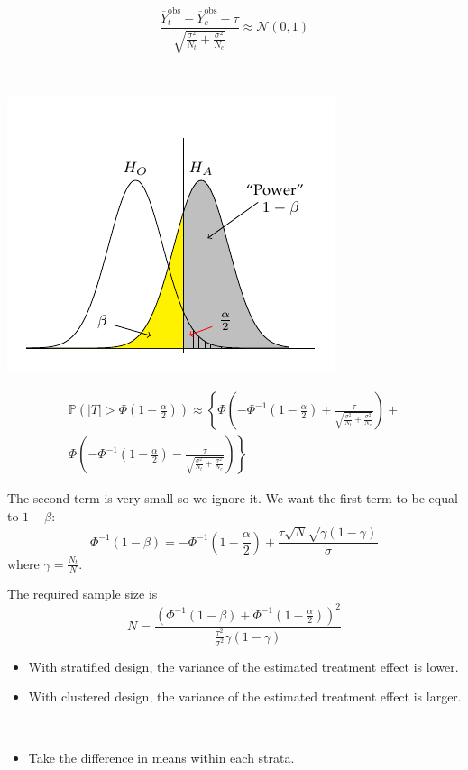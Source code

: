 \documentclass[a4paper,10pt,landscape]{article}
\begin{document}
\begin{multicols*}{3}
\begin{description}
	$$\dfrac{\overline{Y}_t^\text{obs}-\overline{Y}_c^\text{obs}-\tau}{\sqrt{\frac{\sigma^2}{N_t}+\frac{\sigma^2}{N_c}}}\approx\mathcal{N}(0,1)$$
	\item[Statistical Power] ~
	\begin{center}
		\includegraphics*[width=0.6\columnwidth,trim={0 0.1cm 0 1.1cm},clip]{power2.pdf}
	\end{center}
	\begin{multline*}
		\mathbb{P}\left(|T|>\Phi\left(1-\frac{\alpha}{2}\right)\right)\approx\left\{\Phi\left(-\Phi^{-1}\left(1-\frac{\alpha}{2}\right)+\frac{\tau}{\sqrt{\frac{\sigma^2}{N_t}+\frac{\sigma^2}{N_c}}}\right)+\right.\\
		\left.\Phi\left(-\Phi^{-1}\left(1-\frac{\alpha}{2}\right)-\frac{\tau}{\sqrt{\frac{\sigma^2}{N_t}+\frac{\sigma^2}{N_c}}}\right)\right\}
	\end{multline*}
	\item The second term is very small so we ignore it. We want the first term to be equal to $1-\beta$:
	$$\Phi^{-1}\left(1-\beta\right)=-\Phi^{-1}\left(1-\frac{\alpha}{2}\right)+\frac{\tau\sqrt{N}\sqrt{\gamma(1-\gamma)}}{\sigma}$$
	where $\gamma=\frac{N_t}{N}$.
	\item The required sample size is
	$$N=\dfrac{\left(\Phi^{-1}\left(1-\beta\right)+\Phi^{-1}\left(1-\frac{\alpha}{2}\right)\right)^2}{\frac{\tau^2}{\sigma^2}\gamma\left(1-\gamma\right)}$$
	\begin{itemize}
		\item With stratified design, the variance of the estimated treatment effect is lower.
		\item With clustered design, the variance of the estimated treatment effect is larger.
	\end{itemize}
	\item[Stratified Design] ~
	\begin{itemize}[itemsep=0pt]
		\item Take the difference in means within each strata.

\end{itemize}
\end{description}
\end{multicols*}
\end{document}
